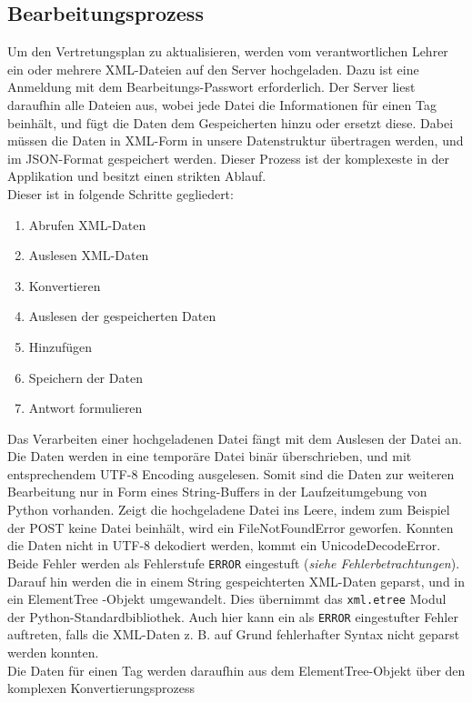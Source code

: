 \subsection{Bearbeitungsprozess}
Um den Vertretungsplan zu aktualisieren, werden vom verantwortlichen Lehrer ein oder mehrere
XML-Dateien auf den Server hochgeladen. Dazu ist eine Anmeldung mit dem Bearbeitungs-Passwort
erforderlich. Der Server liest daraufhin alle Dateien aus, wobei jede Datei die Informationen
für einen Tag beinhält, und fügt die Daten dem Gespeicherten hinzu oder ersetzt diese. Dabei
müssen die Daten in XML-Form in unsere Datenstruktur übertragen werden, und im JSON-Format
gespeichert werden. Dieser Prozess ist der komplexeste in der Applikation und besitzt einen
strikten Ablauf.\\
Dieser ist in folgende Schritte gegliedert:
\begin{enumerate}[itemsep=0pt]
	\item Abrufen XML-Daten
	\item Auslesen XML-Daten
	\item Konvertieren
	\item Auslesen der gespeicherten Daten
	\item Hinzufügen
	\item Speichern der Daten
	\item Antwort formulieren
\end{enumerate}
Das Verarbeiten einer hochgeladenen Datei fängt mit dem Auslesen der Datei an. Die Daten werden
in eine temporäre Datei binär überschrieben, und mit entsprechendem UTF-8 Encoding ausgelesen.
Somit sind die Daten zur weiteren Bearbeitung nur in Form eines String-Buffers in der Laufzeitumgebung
von Python vorhanden. Zeigt die hochgeladene Datei ins Leere, indem zum Beispiel der POST keine
Datei beinhält, wird ein FileNotFoundError geworfen. Konnten die Daten nicht in UTF-8
dekodiert werden, kommt ein UnicodeDecodeError. Beide Fehler werden als Fehlerstufe 
\texttt{ERROR} eingestuft (\textit{siehe Fehlerbetrachtungen}).
\\Darauf hin werden die in einem String gespeichterten XML-Daten geparst, und in ein ElementTree
-Objekt umgewandelt. Dies übernimmt das \texttt{xml.etree} Modul der Python-Standardbibliothek.
Auch hier kann ein als \texttt{ERROR} eingestufter Fehler auftreten, falls die XML-Daten z. B. auf
Grund fehlerhafter Syntax nicht geparst werden konnten.\\
Die Daten für einen Tag werden daraufhin aus dem ElementTree-Objekt über den komplexen Konvertierungsprozess
